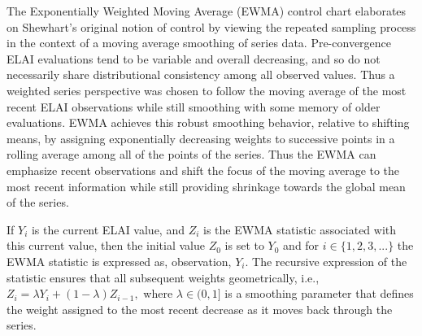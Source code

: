 \documentclass{article}
\begin{document}
%
The Exponentially Weighted Moving Average (EWMA) control chart 
\citep{ewmaPaper, qccPack} elaborates on Shewhart's original notion of control 
by viewing the repeated sampling process in the context of a moving average 
smoothing of series data. Pre-convergence ELAI evaluations tend to be variable 
and overall decreasing, and so do not necessarily share distributional 
consistency among all observed values. 
Thus a weighted series perspective was chosen to follow the moving average of 
the most recent ELAI observations while still smoothing with some memory of 
older evaluations. EWMA achieves this robust smoothing behavior, relative to 
shifting means, by assigning exponentially decreasing weights to successive 
points in a rolling average among all of the points of the series. Thus the 
EWMA can emphasize recent observations and shift the focus of the moving 
average to the most recent information while still providing shrinkage towards 
the global mean of the series.

%
%

%
If $Y_i$ is the current ELAI value, and $Z_i$ is the EWMA statistic associated 
with this current value, then the initial value $Z_0$ is set to $Y_0$ and for 
$i\in\{1, 2, 3, ...\}$ the EWMA statistic is expressed as, observation, $Y_i$. 
The recursive expression of the statistic ensures that all subsequent weights 
geometrically, i.e., $Z_i=\lambda Y_i+(1-\lambda)Z_{i-1},$
where $\lambda \in (0,1]$ is a smoothing parameter that defines the weight 
assigned to the most recent decrease as it moves back through the series.
\end{document}

